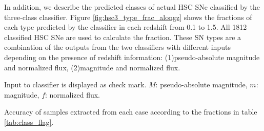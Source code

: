\documentclass[proof]{pasj01}
\begin{document}
In addition, we describe the predicted classes of actual HSC SNe classified by the three-class classifier.
Figure \ref{fig:hsc3_type_frac_alongz} shows the fractions of each type predicted by the classifier in each redshift from 0.1 to 1.5.
All 1812 classified HSC SNe are used to calculate the fraction.
These SN types are a combination of the outputs from the two classifiers with different inputs depending on the presence of redshift information: (1)pseudo-absolute magnitude and normalized flux, (2)magnitude and normalized flux.

%
%
%
%
\begin{table}[htbp]
\label{tab:h3_validation}
\begin{tabnote}
\footnotemark[$*$] Input to classifier is displayed as check mark. $M$: pseudo-absolute magnitude, $m$: magnitude, $f$: normalized flux.

\footnotemark[$\dagger$] %
Accuracy of samples extracted from each case according to the fractions in table \ref{tab:class_flag}.
\end{tabnote}
\end{table}
\end{document}
